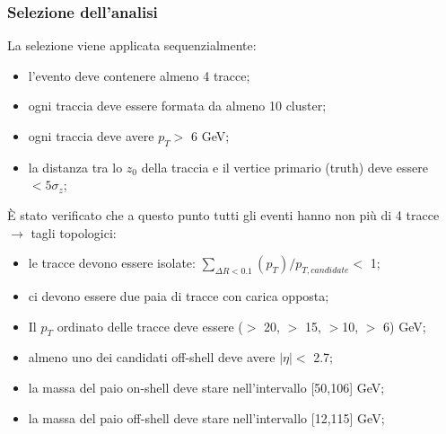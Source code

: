 \documentclass{beamer}
\begin{document}
\begin{frame}[t]
\frametitle{Selezione dell'analisi}

La selezione viene applicata sequenzialmente:
\begin{itemize}
\item<1-> l'evento deve contenere almeno 4 tracce;
\item<2-> ogni traccia deve essere formata da almeno 10 cluster;
\item<3-> ogni traccia deve avere $p_{T} >$ 6 GeV;
\item<4-> la distanza tra lo $z_{0}$ della traccia e il vertice primario (truth) deve essere $< 5\sigma_{z}$;
\end{itemize}
\medskip
\pause
\pause
\pause
\pause
\`E stato verificato che a questo punto tutti gli eventi hanno non pi\`u di 4 tracce $\rightarrow$ tagli topologici:
\begin{itemize}
\item<6-> le tracce devono essere isolate: $\sum_{\Delta R < 0.1} (p_{T}) / p_{T, candidate} <$ 1;
\item<7-> ci devono essere due paia di tracce con carica opposta;
\item<8-> Il $p_{T}$ ordinato delle tracce deve essere ($>$ 20, $>$ 15, $>$10, $>$ 6) GeV;
\item<9-> almeno uno dei candidati off-shell
deve avere $|\eta| <$ 2.7;
\item<10-> la massa del paio on-shell deve stare nell'intervallo [50,106] GeV;
\item<11-> la massa del paio off-shell deve stare nell'intervallo [12,115] GeV;
\end{itemize}

\end{frame}

\end{document}
